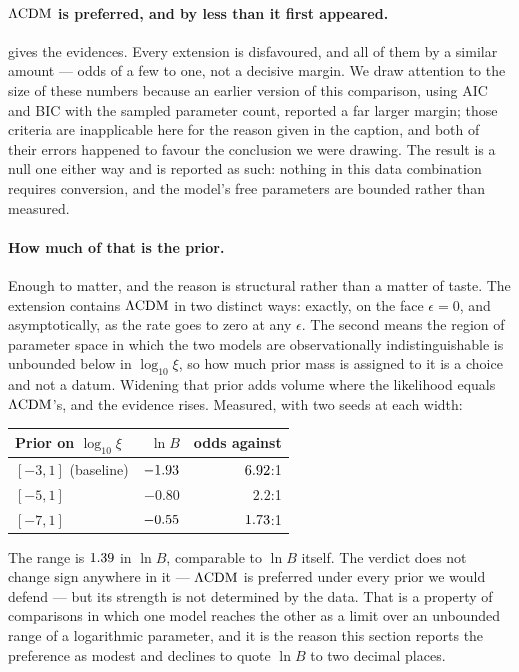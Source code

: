 \paragraph{$\Lambda\mathrm{CDM}$ is preferred, and by less than it first appeared.}
 gives the evidences. Every extension is disfavoured, and
all of them by a similar amount --- odds of a few to one, not a decisive
margin. We draw attention to the size of these numbers because an earlier
version of this comparison, using AIC and BIC with the sampled parameter count,
reported a far larger margin; those criteria are inapplicable here for the
reason given in the caption, and both of their errors happened to favour the
conclusion we were drawing. The result is a null one either way and is reported
as such: nothing in this data combination requires conversion, and the model's
free parameters are bounded rather than measured.

\paragraph{How much of that is the prior.} Enough to matter, and the reason is
structural rather than a matter of taste. The extension contains $\Lambda\mathrm{CDM}$ in two
distinct ways: exactly, on the face $\epsilon=0$, and asymptotically, as the
rate goes to zero at any $\epsilon$. The second means the region of parameter
space in which the two models are observationally indistinguishable is
unbounded below in $\log_{10}\xi$, so how much prior mass is assigned to it is a
choice and not a datum. Widening that prior adds volume where the likelihood
equals $\Lambda\mathrm{CDM}$'s, and the evidence rises. Measured, with two seeds at each
width:

\begin{center}
\begin{tabular}{lrr}
  \toprule
  Prior on $\log_{10}\xi$ & $\ln B$ & odds against \\
  \midrule
  $[-3,1]$ (baseline) & $-1.93$ & $6.92$:1 \\
  $[-5,1]$            & $-0.80$ & $2.2$:1 \\
  $[-7,1]$            & $-0.55$ & $1.73$:1 \\
  \bottomrule
\end{tabular}
\end{center}

The range is $1.39$ in $\ln B$, comparable to $\ln B$ itself.
The verdict does not change sign anywhere in it --- $\Lambda\mathrm{CDM}$ is preferred under
every prior we would defend --- but its strength is not determined by the data.
That is a property of comparisons in which one model reaches the other as a
limit over an unbounded range of a logarithmic parameter, and it is the reason
this section reports the preference as modest and declines to quote $\ln B$ to
two decimal places.

